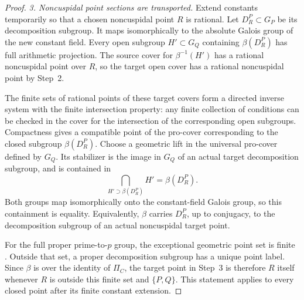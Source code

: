 \documentclass[11pt]{article}
\begin{document}
\begin{proof}
\emph{3. Noncuspidal point sections are transported.}
Extend constants temporarily so that a chosen
noncuspidal point \(R\) is rational. Let
\(D_R^P\subset G_P\) be its decomposition subgroup.
It maps isomorphically to the absolute Galois group
of the new constant field. Every open subgroup
\(H'\subset G_Q\) containing \(\beta(D_R^P)\)
has full arithmetic projection. The source cover
for \(\beta^{-1}(H')\) has a rational noncuspidal
point over \(R\), so the target open cover has a
rational noncuspidal point by Step~2.

The finite sets of rational points of these target
covers form a directed inverse system with the
finite intersection property: any finite collection
of conditions can be checked in the cover for the
intersection of the corresponding open subgroups.
Compactness gives a compatible point of the
pro-cover corresponding to the closed subgroup
\(\beta(D_R^P)\). Choose a geometric lift in the
universal pro-cover defined by \(G_Q\). Its
stabilizer is the image in \(G_Q\) of an actual
target decomposition subgroup, and is contained in
\[
        \bigcap_{H'\supset\beta(D_R^P)}H'
                                      =\beta(D_R^P).
\]
Both groups map isomorphically onto the constant-field
Galois group, so this containment is equality.
Equivalently, \(\beta\) carries \(D_R^P\), up to
conjugacy, to the decomposition subgroup of an actual
noncuspidal target point.

For the full proper prime-to-\(p\) group, the
exceptional geometric point set is finite
\cite[Proposition~1.8(vi)]{AR_ST2009}.
Outside that set, a proper decomposition subgroup
has a unique point label. Since \(\beta\) is over
the identity of \(\Pi_C\), the target point in
Step~3 is therefore \(R\) itself whenever \(R\)
is outside this finite set and \(\{P,Q\}\).
This statement applies to every closed point after
its finite constant extension.


\end{proof}
\end{document}
